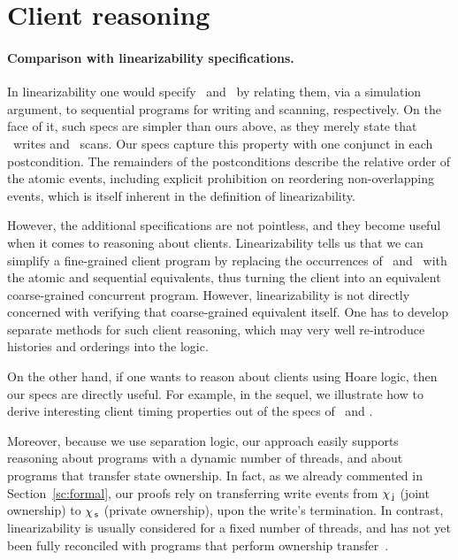 \section{Client reasoning}
\label{sc:clients}

\paragraph*{Comparison with linearizability specifications.}

In linearizability one would specify \jywrite\ and \jyscan\ by
relating them, via a simulation argument, to sequential programs for
writing and scanning, respectively. On the face of it, such specs are
simpler than ours above, as they merely state that \jywrite\ writes
and \jyscan\ scans. Our specs capture this property with one conjunct
in each postcondition. The remainders of the postconditions describe
the relative order of the atomic events, including explicit
prohibition on reordering non-overlapping events, which is itself
inherent in the definition of linearizability.

However, the additional specifications are not pointless, and they
become useful when it comes to reasoning about
clients. Linearizability tells us that we can simplify a fine-grained
client program by replacing the occurrences of \jywrite\ and
\jyscan\ with the atomic and sequential equivalents, thus turning the
client into an equivalent coarse-grained concurrent program. However,
linearizability is not directly concerned with verifying that
coarse-grained equivalent itself. One has to develop separate methods
for such client reasoning, which may very well re-introduce histories
and orderings into the logic.

On the other hand, if one wants to reason about clients using Hoare
logic, then our specs are directly useful. For example, in the sequel,
we illustrate how to derive interesting client timing properties out
of the specs of \jywrite\ and \jyscan.

Moreover, because we use separation logic, our approach easily
supports reasoning about programs with a dynamic number of threads,
and about programs that transfer state ownership. In fact, as we
already commented in Section~\ref{sc:formal}, our proofs rely on
transferring write events from $\chi_{\, \mathsf{j}}$ (joint ownership) to $\chi_{\, \mathsf{s}}$
(private ownership), upon the write's termination. In contrast,
linearizability is usually considered for a fixed number of threads,
and has not yet been fully reconciled with programs that perform
ownership transfer~\cite{Cerone-Gotsman-Yang+ICALP14}.

